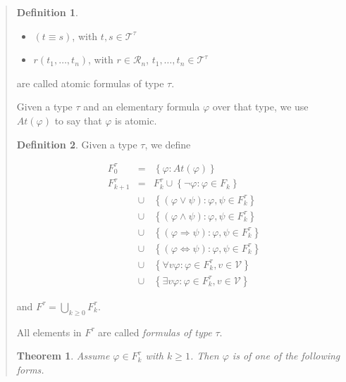 \documentclass[a4paper, 12pt]{article}
\newtheorem{theorem}{Theorem}
\theoremstyle{definition}
\theoremstyle{definition}
\theoremstyle{definition}
\newtheorem{definition}{Definition}
\begin{document}
\begin{quote}
\begin{definition}
    \begin{itemize}
        \item $(t \equiv s)$, with $t, s \in \mathcal{T}^\tau$
        \item $r(t_1,\ldots, t_n)$, with $r \in \mathcal{R}_n$, $t_1, \ldots, t_n \in \mathcal{T}^\tau$
    \end{itemize}

    are called atomic formulas of type $\tau$.
\end{definition}

Given a type $\tau$ and an elementary formula $\varphi$ over that type, we use
$At(\varphi)$ to say that $\varphi$ is atomic.

\begin{definition}
    Given a type $\tau$, we define

    \begin{align*}
        &F_0^{\tau} &= &\left\{ \varphi : At(\varphi) \right\} \\ 
        &F_{k+1}^{\tau} &= &F_k^{\tau} \cup \left\{ \neg \varphi : \varphi \in F_{k} \right\}  \\ 
        &&\cup &\left\{ (\varphi \lor \psi) : \varphi, \psi \in F_k^\tau \right\} \\ 
        &&\cup &\left\{ (\varphi \land  \psi) : \varphi, \psi \in F_k^\tau \right\}  \\ 
        &&\cup &\left\{ (\varphi \Rightarrow \psi) : \varphi, \psi \in F_k^\tau \right\} \\ 
        &&\cup &\left\{ (\varphi \iff\psi) : \varphi, \psi \in F_k^\tau \right\} \\ 
        &&\cup &\left\{ \forall v \varphi : \varphi \in F_k^\tau, v \in \mathcal{V} \right\}  \\ 
        &&\cup & \left\{ \exists v \varphi : \varphi \in F_k^\tau, v \in \mathcal{V} \right\} 
    \end{align*}

    and $F^\tau = \bigcup_{k\geq 0} F_k^\tau$.
\end{definition}

All elements in $F^\tau$ are called \textit{formulas of type } $\tau$.

\begin{theorem}
    Assume $\varphi \in F_k^\tau$ with $k \geq 1$. Then $\varphi$ is of one of 
    the following forms. 


\end{theorem}
\end{quote}
\end{document}
